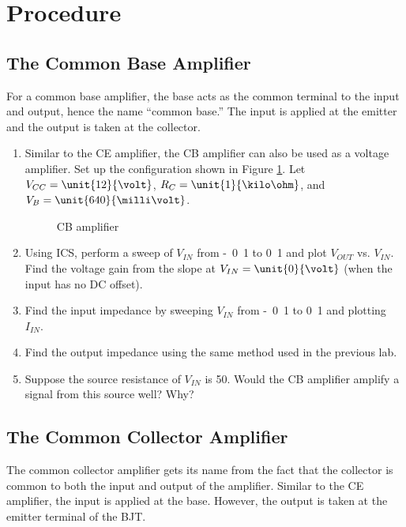 \documentclass{article}
\begin{document}
\section{Procedure}

\subsection{The Common Base Amplifier}
For a common base amplifier, the base acts as the common terminal to the input and output, hence the name ``common base.'' The input is applied at the emitter and the output is taken at the collector.

\begin{enumerate}
\item Similar to the CE amplifier, the CB amplifier can also be used as a voltage amplifier. Set up the configuration shown in Figure \ref{nmos}. Let $V_{CC} = \unit{12}{\volt}$, $R_C = \unit{1}{\kilo\ohm}$, and $V_B = \unit{640}{\milli\volt}$.

	\begin{figure}[!htb]
		
		\centerline{\box\graph}
		\caption{CB amplifier}
		\label{nmos}
	\end{figure}

\item Using ICS, perform a sweep of $V_{IN}$ from \unit{-0.1}{\volt} to \unit{0.1}{\volt} and plot $V_{OUT}$ vs. $V_{IN}$. Find the voltage gain from the slope at $V_{IN} = \unit{0}{\volt}$ (when the input has no DC offset).
\item Find the input impedance by sweeping $V_{IN}$ from \unit{-0.1}{\volt} to \unit{0.1}{\volt} and plotting $I_{IN}$. 
\item Find the output impedance using the same method used in the previous lab.
\item Suppose the source resistance of $V_{IN}$ is \unit{50}{\ohm}. Would the CB amplifier amplify a signal from this source well? Why?

\end{enumerate}

\subsection{The Common Collector Amplifier}
The common collector amplifier gets its name from the fact that the collector is common to both the input and output of the amplifier. Similar to the CE amplifier, the input is applied at the base. However, the output is taken at the emitter terminal of the BJT.
\end{document}
